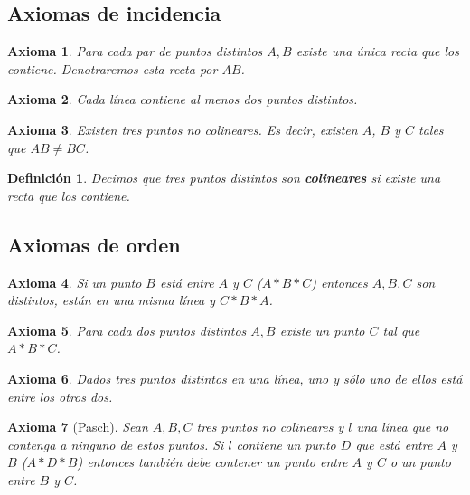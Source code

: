 \documentclass[12pt, spanish]{article}
\newtheorem*{defin}{Definición}
\def\theaxsection{}
\newcommand{\setaxsection}[1]{\def\theaxsection{#1}\setcounter{ax}{0}}
\theoremstyle{axstyle}
\newtheorem{ax}{Axioma}
\theoremstyle{axbstyle}
\begin{document}
\subsection{Axiomas de incidencia}
\setaxsection{I}

\begin{ax}\label{I1}
    Para cada par de puntos distintos $A, B$ existe una única recta que los
    contiene. Denotraremos esta recta por $AB$.
\end{ax}

\begin{ax}\label{I2}
    Cada línea contiene al menos dos puntos distintos.
\end{ax}

\begin{ax}\label{I3}
   Existen tres puntos no colineares. Es decir, existen $A$, $B$ y $C$ tales que
   $AB\neq BC$.
\end{ax}

\begin{defin}
  Decimos que tres puntos distintos son \textbf{colineares} si existe una recta 
  que los contiene.
\end{defin}

\subsection{Axiomas de orden}
\setaxsection{B}

\begin{ax}\label{B1}
  Si un punto $B$ está entre $A$ y $C$ ($A * B * C$) entonces $A, B, C$ son
  distintos, están en una misma línea y $C * B * A$.
\end{ax}

\begin{ax}\label{B2}
  Para cada dos puntos distintos $A,B$ existe un punto $C$ tal que $A * B * C$.
\end{ax}

\begin{ax}\label{B3}
  Dados tres puntos distintos en una línea, uno y sólo uno de ellos está entre
  los otros dos.
\end{ax}

\begin{ax}[Pasch]\label{B4} 
  Sean $A, B, C$ tres puntos no colineares y $l$ una línea que no contenga a 
  ninguno de estos puntos. Si $l$ contiene un punto $D$ que está entre $A$ y $B$ 
  ($A * D * B$) entonces también debe contener un punto entre $A$ y $C$ o un
  punto entre $B$ y $C$.
\end{ax}
\end{document}
